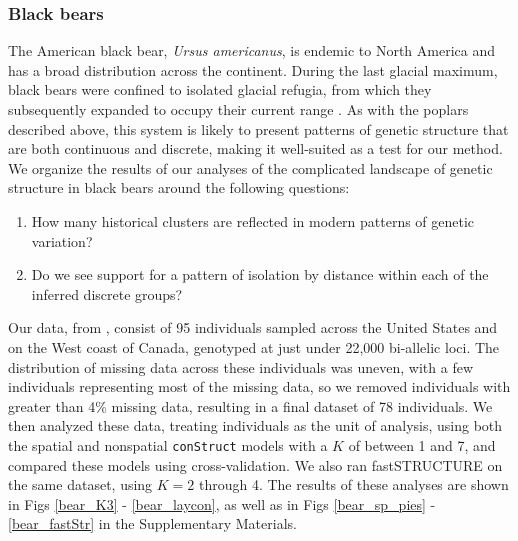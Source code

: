 \documentclass[12pt]{article}
\begin{document}
\subsubsection*{Black bears}
The American black bear, \textit{Ursus americanus}, is endemic to North America
and has a broad distribution across the continent.
During the last glacial maximum, 
black bears were confined to isolated glacial refugia, 
from which they subsequently expanded to occupy their current range
\citep{WoodingWard1997,Byun1997,Stone2000,Puckett2015}.
As with the poplars described above, 
this system is likely to present patterns of genetic structure 
that are both continuous and discrete, 
making it well-suited as a test for our method.
We organize the results of our analyses of 
the complicated landscape of genetic structure in black bears 
around the following questions:
\begin{enumerate}
\item How many historical clusters are reflected in modern patterns of genetic variation?
\item Do we see support for a pattern of isolation by distance within each of the inferred discrete groups?
\end{enumerate}

Our data, from \cite{Puckett2015}, consist of 95 individuals 
sampled across the United States and on the West coast of Canada,
genotyped at just under 22,000 bi-allelic loci.
The distribution of missing data across these individuals was uneven, 
with a few individuals representing most of the missing data, 
so we removed individuals with greater than 4\% missing data, 
resulting in a final dataset of 78 individuals.
We then analyzed these data, treating individuals as the unit of analysis, 
using both the spatial and nonspatial \texttt{conStruct} models with a $K$ of between 1 and 7, 
and compared these models using cross-validation.
We also ran fastSTRUCTURE \citep{fastStructure} on the same dataset, 
using $K = 2$ through 4.
The results of these analyses are shown in Figs \ref{bear_K3} - \ref{bear_laycon}, 
as well as in Figs \ref{bear_sp_pies} - \ref{bear_fastStr} in the Supplementary Materials.
\end{document}
